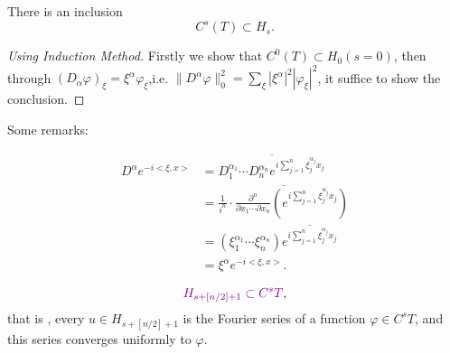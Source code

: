 \documentclass[twoside,openany,12pt]{beautynote}
\begin{document}
\begin{lemma}
  There is an inclusion
  \[ C^s (T) \subset H_s . \]
\end{lemma}

\begin{proof}[Using Induction Method]
  Firstly we show that $C^0 (T) \subset H_0  (s = 0)$, then through
  $(D_{\alpha} \varphi)_{\xi} = \xi^{\alpha} \varphi_{\xi}$,i.e. $\|D^{\alpha}
  \varphi \|_0^2 = \sum_{\xi} | \xi^{\alpha} |^2 | \varphi_{\xi} |^2$, it
  suffice to show the conclusion.
\end{proof}

Some remarks:

\begin{align*}
  D^{\alpha} e^{- i < \xi, x >} & = \overline{D_1^{\alpha_1} \cdots
  D_n^{\alpha_n} e^{i \sum_{j = 1}^n \xi_j^{\alpha_j} x_j}}\\
  & = \overline{ \frac{1}{i^n} \cdot \frac{\partial^n}{\partial  x_1 \cdots
  \partial x_n} \left( e^{i \sum_{j = 1}^n \xi_j^{\alpha_j} x_j} \right)}\\
  & = (\xi_{1 }^{\alpha_1} \cdots \xi_n^{\alpha_n}) \overline{e^{i \sum_{j =
  1}^n \xi_j^{\alpha_j} x_j}}\\
  & = \xi^{\alpha} e^{- i < \xi, x >} .
\end{align*}

\begin{lemma}
  
  \[ {\color[HTML]{800080}H_{s + [n / 2] + 1} \subset C^s T}, \]
  that is , every $u \in H_{s + [n / 2] + 1}$ is the Fourier series of a
  function $\varphi \in C^s T$, and this series converges uniformly to
  $\varphi$.
\end{lemma}
\end{document}
